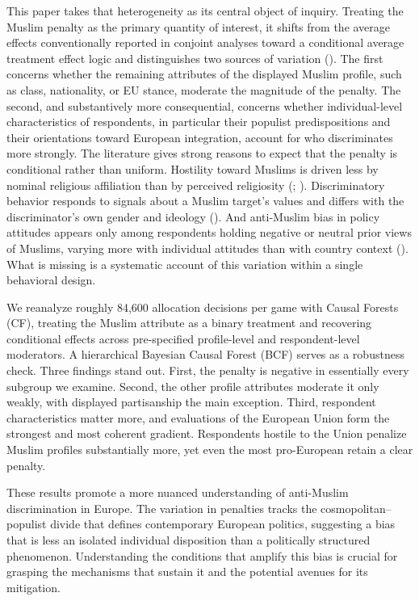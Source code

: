 \documentclass[
  10pt,
  a4paper,
  DIV=11,
  numbers=noendperiod]{scrartcl}
\begin{document}
This paper takes that heterogeneity as its central object of inquiry.
Treating the Muslim penalty as the primary quantity of interest, it
shifts from the average effects conventionally reported in conjoint
analyses toward a conditional average treatment effect logic and
distinguishes two sources of variation
(). The first
concerns whether the remaining attributes of the displayed Muslim
profile, such as class, nationality, or EU stance, moderate the
magnitude of the penalty. The second, and substantively more
consequential, concerns whether individual-level characteristics of
respondents, in particular their populist predispositions and their
orientations toward European integration, account for who discriminates
more strongly. The literature gives strong reasons to expect that the
penalty is conditional rather than uniform. Hostility toward Muslims is
driven less by nominal religious affiliation than by perceived
religiosity (; ). Discriminatory behavior responds to signals about a Muslim
target's values and differs with the discriminator's own gender and
ideology (). And
anti-Muslim bias in policy attitudes appears only among respondents
holding negative or neutral prior views of Muslims, varying more with
individual attitudes than with country context
(). What is missing is
a systematic account of this variation within a single behavioral
design.

We reanalyze roughly 84,600 allocation decisions per game with Causal
Forests (CF), treating the Muslim attribute as a binary treatment and
recovering conditional effects across pre-specified profile-level and
respondent-level moderators. A hierarchical Bayesian Causal Forest (BCF)
serves as a robustness check. Three findings stand out. First, the
penalty is negative in essentially every subgroup we examine. Second,
the other profile attributes moderate it only weakly, with displayed
partisanship the main exception. Third, respondent characteristics
matter more, and evaluations of the European Union form the strongest
and most coherent gradient. Respondents hostile to the Union penalize
Muslim profiles substantially more, yet even the most pro-European
retain a clear penalty.

These results promote a more nuanced understanding of anti-Muslim
discrimination in Europe. The variation in penalties tracks the
cosmopolitan--populist divide that defines contemporary European
politics, suggesting a bias that is less an isolated individual
disposition than a politically structured phenomenon. Understanding the
conditions that amplify this bias is crucial for grasping the mechanisms
that sustain it and the potential avenues for its mitigation.
\end{document}

